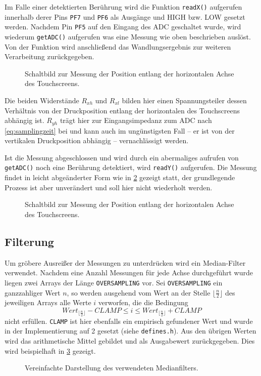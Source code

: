 		Im Falle einer detektierten Berührung wird die Funktion \texttt{readX()} aufgerufen innerhalb derer Pins \texttt{PF7} und \texttt{PF6} als Ausgänge und HIGH bzw. LOW gesetzt werden.
		Nachdem Pin \texttt{PF5} auf den Eingang des ADC geschaltet wurde, wird wiederum \texttt{getADC()} aufgerufen was eine Messung wie oben beschrieben auslöst.
		Von der Funktion wird anschließend das Wandlungsergebnis zur weiteren Verarbeitung zurückgegeben.
		\begin{figure}[ht]
			\centering
			\caption{Schaltbild zur Messung der Position entlang der horizontalen Achse des Touchscreens.}
			\label{fig:readX schaltbild}
		\end{figure}
		Die beiden Widerstände \(R_{xh}\) und \(R_{xl}\) bilden hier einen Spannungsteiler dessen Verhältnis von der Druckposition entlang der horizontalen des Touchscreens abhängig ist.
		\(R_{yh}\) trägt hier zur Eingangsimpedanz zum ADC nach \cref{eq:samplingzeit} bei und kann auch im ungünstigsten Fall -- er ist von der vertikalen Druckposition abhängig -- vernachlässigt werden.\par
		Ist die Messung abgeschlossen und wird durch ein abermaliges aufrufen von \texttt{getADC()} noch eine Berührung detektiert, wird \texttt{readY()} aufgerufen.
		Die Messung findet in leicht abgeänderter Form wie in \cref{fig:readY schaltbild} gezeigt statt, der grundlegende Prozess ist aber unverändert und soll hier nicht wiederholt werden.
		\begin{figure}[ht]
			\centering
			\caption{Schaltbild zur Messung der Position entlang der horizontalen Achse des Touchscreens.}
			\label{fig:readY schaltbild}
		\end{figure}

		\subsection{Filterung}
			Um gröbere Ausreißer der Messungen zu unterdrücken wird ein Median-Filter verwendet.
			Nachdem eine Anzahl Messungen für jede Achse durchgeführt wurde liegen zwei Arrays der Länge \texttt{OVERSAMPLING} vor.
			Sei \texttt{OVERSAMPLING} ein ganzzahliger Wert \(n\), so werden ausgehend vom Wert an der Stelle \(\lfloor \frac{n}{2}\rfloor\) des jeweiligen Arrays alle Werte \(i\) verworfen, die die Bedingung
			\begin{equation}
				Wert_{\lfloor \frac{n}{2}\rfloor} - CLAMP \leq i \leq Wert_{\lfloor \frac{n}{2}\rfloor} + CLAMP
			\end{equation}
			nicht erfüllen.
			\texttt{CLAMP} ist hier ebenfalls ein empirisch gefundener Wert und wurde in der Implementierung auf 2 gesetzt (siehe \texttt{defines.h}).
			Aus den übrigen Werten wird das arithmetische Mittel gebildet und als Ausgabewert zurückgegeben.
			Dies wird beispielhaft in \cref{fig:medianfilterdarstellung} gezeigt.
			\begin{figure}[ht]
				\centering
				\caption{Vereinfachte Darstellung des verwendeten Medianfilters.}
				\label{fig:medianfilterdarstellung}
			\end{figure}
